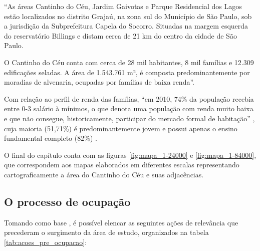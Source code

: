 	\begin{citacao}
		``As áreas Cantinho do Céu, Jardim Gaivotas e Parque Residencial dos Lagos estão localizados no distrito Grajaú, na zona sul do Município de São Paulo, sob a jurisdição da Subprefeitura Capela do Socorro. Situadas na margem esquerda do reservatório Billings e distam cerca de 21 km do centro da cidade de São Paulo. 
		
		O Cantinho do Céu conta com cerca de 28 mil habitantes, 8 mil famílias e 12.309 edificações seladas. A área de 1.543.761 m², é composta predominantemente por moradias de alvenaria, ocupadas por famílias de baixa renda''.
	\end{citacao}
		
	Com relação ao perfil de renda das famílias, ``em 2010, 74\% da população recebia entre 0-3 salário à mínimos, o que denota uma população com renda muito baixa e que não consegue, historicamente, participar do mercado formal de habitação'' \cite[p.116]{Silva2016}, cuja maioria (51,71\%) é predominantemente jovem e possui apenas o ensino fundamental completo (82\%) \cite[p.116]{Silva2016}.

	O final do capítulo conta com as figuras \ref*{fig:mapa_1-24000} e \ref*{fig:mapa_1-84000}, que correspondem aos mapas elaborados em diferentes escalas representando cartograficamente a área do Cantinho do Céu e suas adjacências.
	
	\subsection{O processo de ocupação} \label{ocupacao}
	
	Tomando como base , é possível elencar as seguintes ações de relevância que precederam o surgimento da área de estudo, organizados na tabela \ref{tab:acoes_pre_ocupacao}:
	
